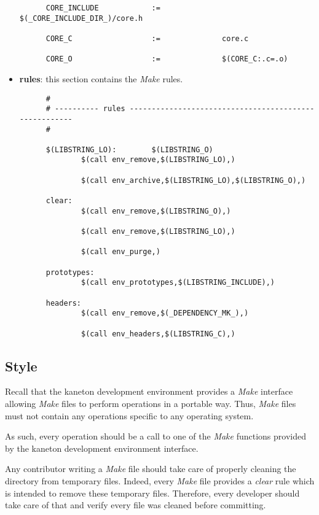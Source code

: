 \begin{itemize}
\begin{verbatim}
      CORE_INCLUDE            :=              $(_CORE_INCLUDE_DIR_)/core.h

      CORE_C                  :=              core.c

      CORE_O                  :=              $(CORE_C:.c=.o)
    \end{verbatim}
  \item
    \textbf{rules}: this section contains the \textit{Make} rules.

    \begin{verbatim}
      #
      # ---------- rules ------------------------------------------------------
      #

      $(LIBSTRING_LO):        $(LIBSTRING_O)
              $(call env_remove,$(LIBSTRING_LO),)

              $(call env_archive,$(LIBSTRING_LO),$(LIBSTRING_O),)

      clear:
              $(call env_remove,$(LIBSTRING_O),)

              $(call env_remove,$(LIBSTRING_LO),)

              $(call env_purge,)

      prototypes:
              $(call env_prototypes,$(LIBSTRING_INCLUDE),)

      headers:
              $(call env_remove,$(_DEPENDENCY_MK_),)

              $(call env_headers,$(LIBSTRING_C),)
    \end{verbatim}
\end{itemize}


\subsection{Style}

Recall that the kaneton development environment provides a \textit{Make}
interface allowing \textit{Make} files to perform operations in a portable
way. Thus, \textit{Make} files must not contain any operations specific
to any operating system.

As such, every operation should be a call to one of the \textit{Make} functions
provided by the kaneton development environment interface.

Any contributor writing a \textit{Make} file should take care of properly
cleaning the directory from temporary files. Indeed, every \textit{Make} file
provides a \textit{clear} rule which is intended to remove these temporary
files. Therefore, every developer should take care of that and verify every
file was cleaned before committing.

